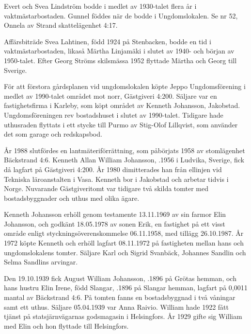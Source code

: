 Evert och Svea Lindström bodde i medlet av 1930-talet flera år i vaktmästarbostaden. Gunnel föddes när de bodde i Ungdomslokalen. Se nr 52, Onnela av Strand skattelägenhet 4:17.

Affärsbiträde Svea Lahtinen, född 1924 på Stenbacken, bodde en tid i vaktmästarbostaden, likaså Märtha Linjamäki i slutet av 1940- och början av 1950-talet. Efter Georg Ströms skilsmässa 1952 flyttade Märtha och Georg till Sverige.





För att förstora gårdsplanen vid ungdomslokalen köpte Jeppo	Ungdomsförening i medlet av 1990-talet området mot norr,	Gästgiveri 4:200. Säljare var en fastighetsfirma i Karleby, som köpt området av Kenneth Johansson, Jakobstad. Ungdomsföreningen	rev bostadshuset i slutet av 1990-talet. Tidigare hade uthusraden	flyttats i ett stycke till Purmo av Stig-Olof Lillqvist, som använder det som garage och redskapsbod.


År 1988 slutfördes en lantmäteriförrättning, som påbörjats 1958	av stomlägenhet Bäckstrand 4:6. Kenneth Allan William Johansson,	.1956 i Ludvika, Sverige, fick då lagfart på Gästgiveri 4:200.	År 1980 dimitterades han från ellinjen vid Tekniska läroanstalten i Vasa.	Kenneth bor i Jakobstad och arbetar tidvis i Norge.	Nuvarande Gästgiveritomt var tidigare två skilda tomter med	bostadsbyggnader och uthus med olika ägare.

Kenneth Johansson erhöll genom testamente 13.11.1969 av sin farmor Elin Johansson, och godkänt 18.05.1978 av sonen Erik, en fastighet på ett visst område enligt styckningsöverenskommelse 06.11.1958, med tillägg 26.10.1987. År 1972 köpte Kenneth och erhöll lagfart 08.11.1972 på fastigheten mellan hans och ungdomslokalens tomter. Säljare Karl och Sigrid Svanbäck, Johannes Sandlin och Selma Sandlins arvingar.


Den 19.10.1939 fick August William Johansson, .1896 på	Grötas hemman, och hans hustru Elin Irene, född Slangar, .1896	på Slangar hemman, lagfart på 0,0011 mantal av Bäckstrand 4:6. På tomten fanns en bostadsbyggnad i två våningar samt ett uthus. Säljare 05.04.1939 var Anna Raivio. William hade 1922 fått tjänst på 	statsjärnvägarnas godsmagasin i Helsingfors. År 1929 gifte sig William med Elin och hon flyttade till Helsingfors.

